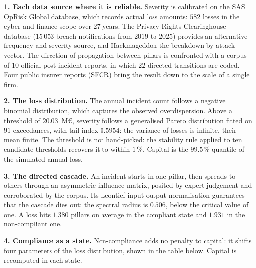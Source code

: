 \textbf{1. Each data source where it is reliable.} Severity is calibrated on the SAS OpRisk Global
database, which records actual loss amounts: $582$ losses in the cyber and finance scope over
$27$ years. The Privacy Rights Clearinghouse database ($15\,053$ breach notifications from $2019$
to $2025$) provides an alternative frequency and severity source, and Hackmageddon the breakdown by
attack vector. The direction of propagation between pillars is confronted with a corpus of $10$
official post-incident reports, in which $22$ directed transitions are coded. Four public insurer
reports (SFCR) bring the result down to the scale of a single firm.

\textbf{2. The loss distribution.} The annual incident count follows a negative binomial
distribution, which captures the observed overdispersion. Above a threshold of $20.03$~M\euro,
severity follows a generalised Pareto distribution fitted on $91$ exceedances, with tail index
$0.5954$: the variance of losses is infinite, their mean finite. The threshold is not hand-picked:
the stability rule applied to ten candidate thresholds recovers it to within $1\,\%$. Capital is
the $99.5\,\%$ quantile of the simulated annual loss.

\textbf{3. The directed cascade.} An incident starts in one pillar, then spreads to others through
an asymmetric influence matrix, posited by expert judgement and corroborated by the corpus. Its
Leontief input-output normalisation guarantees that the cascade dies out: the spectral radius is
$0.506$, below the critical value of one. A loss hits $1.380$ pillars on average in the compliant
state and $1.931$ in the non-compliant one.

\textbf{4. Compliance as a state.} Non-compliance adds no penalty to capital: it shifts four
parameters of the loss distribution, shown in the table below. Capital is recomputed in each state.

